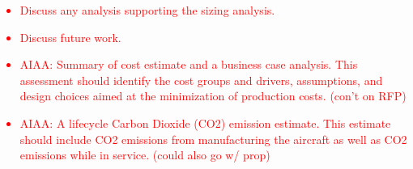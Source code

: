 \textcolor{red}{
\begin{itemize}
    \item Discuss any analysis supporting the sizing analysis.
    \item Discuss future work.
    \item AIAA: Summary of cost estimate and a business case analysis. This assessment should
    identify the cost groups and drivers, assumptions, and design choices aimed at the minimization of production costs. (con't on RFP)
    \item AIAA: A lifecycle Carbon Dioxide (CO2) emission estimate. This estimate should include CO2
    emissions from manufacturing the aircraft as well as CO2 emissions while in service. (could also go w/ prop)
\end{itemize}}